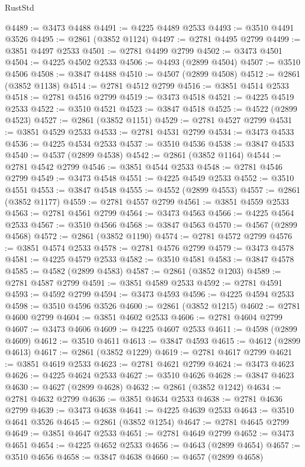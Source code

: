 \begin{lexlean}{RustStd}
\begin{coremodule}
@4489 := @3473 @4488
@4491 := @4225 @4489 @2533
@4493 := @3510 @4491 @3526
@4495 := @2861 (@3852 @1124)
@4497 := @2781 @4495 @2799
@4499 := @3851 @4497 @2533
@4501 := @2781 @4499 @2799
@4502 := @3473 @4501
@4504 := @4225 @4502 @2533
@4506 := @4493 (@2899 @4504)
@4507 := @3510 @4506
@4508 := @3847 @4488
@4510 := @4507 (@2899 @4508)
@4512 := @2861 (@3852 @1138)
@4514 := @2781 @4512 @2799
@4516 := @3851 @4514 @2533
@4518 := @2781 @4516 @2799
@4519 := @3473 @4518
@4521 := @4225 @4519 @2533
@4522 := @3510 @4521
@4523 := @3847 @4518
@4525 := @4522 (@2899 @4523)
@4527 := @2861 (@3852 @1151)
@4529 := @2781 @4527 @2799
@4531 := @3851 @4529 @2533
@4533 := @2781 @4531 @2799
@4534 := @3473 @4533
@4536 := @4225 @4534 @2533
@4537 := @3510 @4536
@4538 := @3847 @4533
@4540 := @4537 (@2899 @4538)
@4542 := @2861 (@3852 @1164)
@4544 := @2781 @4542 @2799
@4546 := @3851 @4544 @2533
@4548 := @2781 @4546 @2799
@4549 := @3473 @4548
@4551 := @4225 @4549 @2533
@4552 := @3510 @4551
@4553 := @3847 @4548
@4555 := @4552 (@2899 @4553)
@4557 := @2861 (@3852 @1177)
@4559 := @2781 @4557 @2799
@4561 := @3851 @4559 @2533
@4563 := @2781 @4561 @2799
@4564 := @3473 @4563
@4566 := @4225 @4564 @2533
@4567 := @3510 @4566
@4568 := @3847 @4563
@4570 := @4567 (@2899 @4568)
@4572 := @2861 (@3852 @1190)
@4574 := @2781 @4572 @2799
@4576 := @3851 @4574 @2533
@4578 := @2781 @4576 @2799
@4579 := @3473 @4578
@4581 := @4225 @4579 @2533
@4582 := @3510 @4581
@4583 := @3847 @4578
@4585 := @4582 (@2899 @4583)
@4587 := @2861 (@3852 @1203)
@4589 := @2781 @4587 @2799
@4591 := @3851 @4589 @2533
@4592 := @2781 @4591
@4593 := @4592 @2799
@4594 := @3473 @4593
@4596 := @4225 @4594 @2533
@4598 := @3510 @4596 @3526
@4600 := @2861 (@3852 @1215)
@4602 := @2781 @4600 @2799
@4604 := @3851 @4602 @2533
@4606 := @2781 @4604 @2799
@4607 := @3473 @4606
@4609 := @4225 @4607 @2533
@4611 := @4598 (@2899 @4609)
@4612 := @3510 @4611
@4613 := @3847 @4593
@4615 := @4612 (@2899 @4613)
@4617 := @2861 (@3852 @1229)
@4619 := @2781 @4617 @2799
@4621 := @3851 @4619 @2533
@4623 := @2781 @4621 @2799
@4624 := @3473 @4623
@4626 := @4225 @4624 @2533
@4627 := @3510 @4626
@4628 := @3847 @4623
@4630 := @4627 (@2899 @4628)
@4632 := @2861 (@3852 @1242)
@4634 := @2781 @4632 @2799
@4636 := @3851 @4634 @2533
@4638 := @2781 @4636 @2799
@4639 := @3473 @4638
@4641 := @4225 @4639 @2533
@4643 := @3510 @4641 @3526
@4645 := @2861 (@3852 @1254)
@4647 := @2781 @4645 @2799
@4649 := @3851 @4647 @2533
@4651 := @2781 @4649 @2799
@4652 := @3473 @4651
@4654 := @4225 @4652 @2533
@4656 := @4643 (@2899 @4654)
@4657 := @3510 @4656
@4658 := @3847 @4638
@4660 := @4657 (@2899 @4658)

\end{coremodule}
\end{lexlean}
